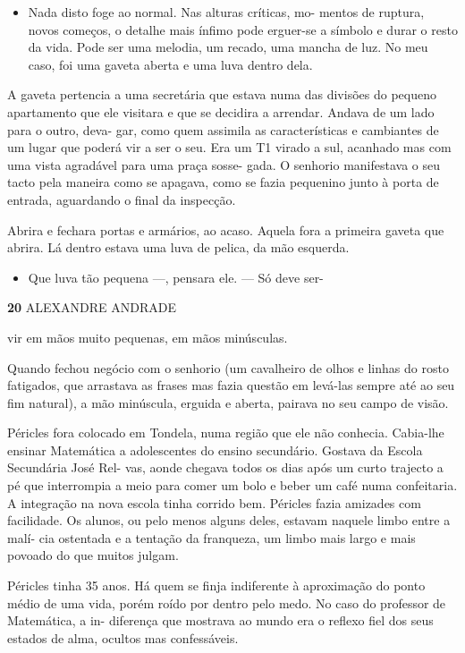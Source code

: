 \begin{itemize}
\tightlist
\item
  Nada disto foge ao normal. Nas alturas críticas, mo- mentos de
  ruptura, novos começos, o detalhe mais ínfimo pode erguer-se a símbolo
  e durar o resto da vida. Pode ser uma melodia, um recado, uma mancha
  de luz. No meu caso, foi uma gaveta aberta e uma luva dentro dela.
\end{itemize}

A gaveta pertencia a uma secretária que estava numa das divisões do
pequeno apartamento que ele visitara e que se decidira a arrendar.
Andava de um lado para o outro, deva- gar, como quem assimila as
características e cambiantes de um lugar que poderá vir a ser o seu. Era
um T1 virado a sul, acanhado mas com uma vista agradável para uma praça
sosse- gada. O senhorio manifestava o seu tacto pela maneira como se
apagava, como se fazia pequenino junto à porta de entrada, aguardando o
final da inspecção.

Abrira e fechara portas e armários, ao acaso. Aquela fora a primeira
gaveta que abrira. Lá dentro estava uma luva de pelica, da mão esquerda.

\begin{itemize}
\tightlist
\item
  Que luva tão pequena ---, pensara ele. --- Só deve ser-
\end{itemize}

\textbf{20 }ALEXANDRE ANDRADE

vir em mãos muito pequenas, em mãos minúsculas.

Quando fechou negócio com o senhorio (um cavalheiro de olhos e linhas do
rosto fatigados, que arrastava as frases mas fazia questão em levá-las
sempre até ao seu fim natural), a mão minúscula, erguida e aberta,
pairava no seu campo de visão.

Péricles fora colocado em Tondela, numa região que ele não conhecia.
Cabia-lhe ensinar Matemática a adolescentes do ensino secundário.
Gostava da Escola Secundária José Rel- vas, aonde chegava todos os dias
após um curto trajecto a pé que interrompia a meio para comer um bolo e
beber um café numa confeitaria. A integração na nova escola tinha
corrido bem. Péricles fazia amizades com facilidade. Os alunos, ou pelo
menos alguns deles, estavam naquele limbo entre a malí- cia ostentada e
a tentação da franqueza, um limbo mais largo e mais povoado do que
muitos julgam.

Péricles tinha 35 anos. Há quem se finja indiferente à aproximação do
ponto médio de uma vida, porém roído por dentro pelo medo. No caso do
professor de Matemática, a in- diferença que mostrava ao mundo era o
reflexo fiel dos seus estados de alma, ocultos mas confessáveis.

